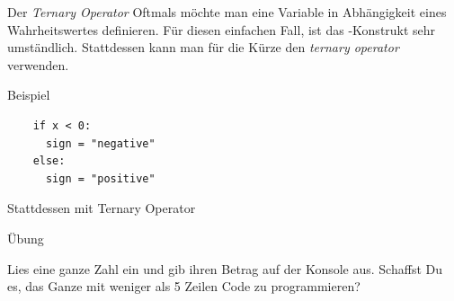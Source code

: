 \begin{fragile}{}
\begin{block}{Der \emph{Ternary Operator}}
\vspace{2pt}
Oftmals möchte man eine Variable in Abhängigkeit eines Wahrheitswertes definieren. Für diesen einfachen Fall, ist das -Konstrukt sehr umständlich. Stattdessen kann man für die Kürze den \emph{ternary operator} verwenden. 
\end{block}
\vspace{12pt}
\pause
\begin{exampleblock}{Beispiel}
	\vspace{2pt}
	\begin{verbatim}
	if x < 0: 
	  sign = "negative"	
	else: 
	  sign = "positive"
	\end{verbatim}
\end{exampleblock}
\pause 
\begin{block}{Stattdessen mit Ternary Operator}
	\vspace{2pt}
\end{block}
\end{fragile}

\begin{frame}{Übung}

\begin{block}{}
	\vspace{2pt}
Lies eine ganze Zahl ein und gib ihren Betrag auf der Konsole aus. Schaffst Du es, das Ganze mit weniger als 5 Zeilen Code zu programmieren? 
\end{block}

\end{frame}




